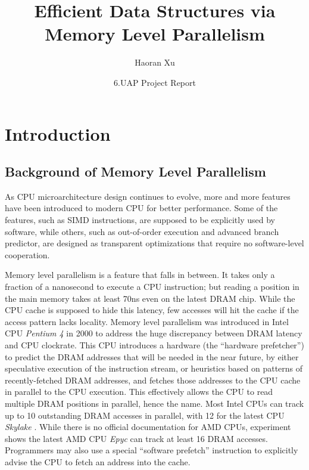 \documentclass[11pt, usletter]{article}
\begin{document}
\title{Efficient Data Structures via Memory Level Parallelism}
\author{Haoran Xu}
\date{6.UAP Project Report}

\maketitle

\tableofcontents

\newpage

\section{Introduction} \label{introduction}

\subsection{Background of Memory Level Parallelism}

As CPU microarchitecture design continues to evolve, more and more features have been introduced 
to modern CPU for better performance. Some of the features, such as SIMD instructions, 
are supposed to be explicitly used by software, while others, such as out-of-order execution 
and advanced branch predictor, are designed as transparent optimizations that require no 
software-level cooperation.

Memory level parallelism is a feature that falls in between. 
It takes only a fraction of a nanosecond to execute a CPU instruction; 
but reading a position in the main memory takes at least 70ns even on the latest DRAM chip.
While the CPU cache is supposed to hide this latency, few accesses will hit the cache if the access pattern lacks locality.
Memory level parallelism was introduced in Intel CPU \textit{Pentium 4} in 2000 
to address the huge discrepancy between DRAM latency and CPU clockrate.
This CPU introduces a hardware (the ``hardware prefetcher'') to predict the DRAM addresses that will be needed in the near future, 
by either speculative execution of the instruction stream, 
or heuristics based on patterns of recently-fetched DRAM addresses, 
and fetches those addresses to the CPU cache in parallel to the CPU execution.
This effectively allows the CPU to read multiple DRAM positions in parallel, hence the name.
Most Intel CPUs can track up to 10 outstanding DRAM accesses in parallel, 
with 12 for the latest CPU \textit{Skylake} \cite{IntelOptGuide}.
While there is no official documentation for AMD CPUs, 
experiment shows the latest AMD CPU \textit{Epyc} can track at least 16 DRAM accesses. 
Programmers may also use a special ``software prefetch'' instruction to
explicitly advise the CPU to fetch an address into the cache.
\end{document}
